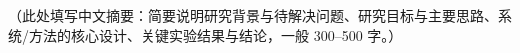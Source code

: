 
\begin{abstractzh}

（此处填写中文摘要：简要说明研究背景与待解决问题、研究目标与主要思路、系统/方法的核心设计、关键实验结果与结论，一般 300--500 字。）

\end{abstractzh}
